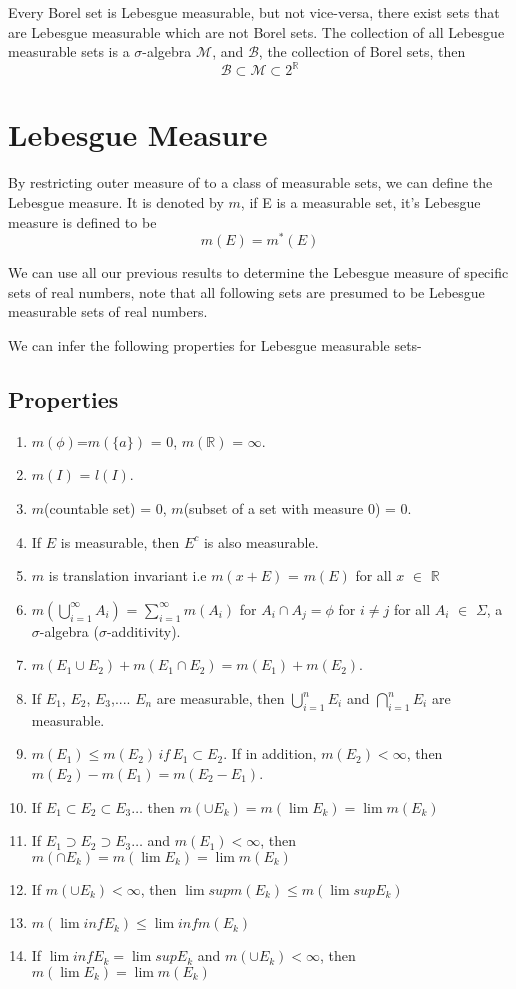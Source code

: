 \documentclass{article}
\begin{document}
Every Borel set is Lebesgue measurable, but not vice-versa, there exist sets that are Lebesgue measurable which are not Borel sets.
The collection of all Lebesgue measurable sets is a $\sigma$-algebra $\mathscr{M}$, and $\mathscr{B}$, the collection of Borel sets, then
$$\mathscr{B} \subset \mathscr{M} \subset 2^{\mathbb{R}} $$
\newpage
\section{Lebesgue Measure}

By restricting outer measure of to a class of measurable sets, we can define the Lebesgue measure. It is denoted by $m$, if E is a measurable set, it's Lebesgue measure is defined to be
$$m(E)=m^*(E)$$

We can use all our previous results to determine the Lebesgue measure of specific sets of real numbers, note that all following sets are presumed to be Lebesgue measurable sets of real numbers.

We can infer the following properties for Lebesgue measurable sets-

\subsection{Properties}
\begin{enumerate}
    \item $m(\phi)$=$m(\{a\})$ = 0, $m(\mathbb{R})$ = $\infty$.
    \item $m(I)$ = $l(I)$.
    \item $m$(countable set) = 0, $m$(subset of a set with measure 0) = 0.
    \item If $E$ is measurable, then $E^c$ is also measurable.
    \item $m$ is translation invariant i.e $m(x + E)$ = $m(E)$ for all $x$ $\in$ $\mathbb{R}$
    \item $m(\bigcup \limits_{i=1}^\infty A_i)$ = $\sum \limits_{i=1}^\infty m(A_i)$ for $A_i \cap A_j = \phi$ for $i \neq j$ for all $A_i$ $\in$ $\Sigma$, a $\sigma$-algebra ($\sigma$-additivity).
    \item $m(E_1 \cup E_2) + m(E_1 \cap E_2) = m(E_1)+ m(E_2)$.
    \item If $E_1$, $E_2$, $E_3$,.... $E_n$ are measurable, then $\bigcup\limits_{i=1}^{n}E_i$ and $\bigcap\limits_{i=1}^{n}E_i$ are measurable.
    \item $m(E_1) \leq m(E_2)\, if \, E_1 \subset E_2$. If in addition, $m(E_2) <\infty$, then $m(E_2)-m(E_1)=m(E_2-E_1)$.
    \item If $E_1 \subset E_2 \subset E_3 \dots$ then $m(\cup E_k)=m(\lim E_k)=\lim m(E_k)$
    \item If $E_1 \supset E_2 \supset E_3 \dots$ and $m(E_1) < \infty $, then $m(\cap     E_k)=m(\lim E_k)=\lim m(E_k)$
    \item If $m(\cup E_k) < \infty$, then $\lim sup m(E_k) \leq m(\lim sup E_k)$
    \item  $ m(\lim inf E_k) \leq \lim inf m(E_k) $
    \item If $\lim inf E_k = \lim sup E_k$ and $m(\cup E_k)<\infty$, then $m(\lim E_k)=\lim m(E_k)$
\end{enumerate}
\end{document}
